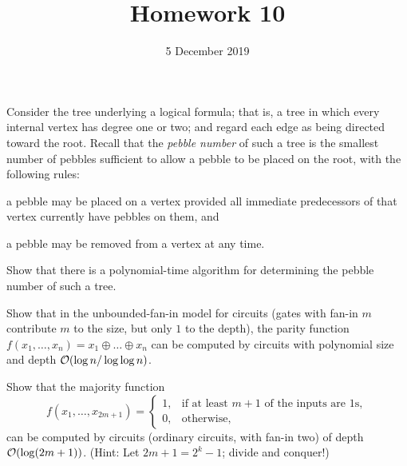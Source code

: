 \documentclass{../math167}
\title{Homework 10}
\author{}
\date{5 December 2019}
\begin{document}
\begin{problems}
\item Consider the tree underlying a logical formula; that is, a tree
  in which every internal vertex has degree one or two; and regard
  each edge as being directed toward the root.  Recall that the
  \emph{pebble number} of such a tree is the smallest number of
  pebbles sufficient to allow a pebble to be placed on the root, with
  the following rules:
  \begin{enumerate*}
  \item a pebble may be placed on a vertex provided all immediate
    predecessors of that vertex currently have pebbles on them, and
  \item a pebble may be removed from a vertex at any time.
  \end{enumerate*}
  Show that there is a polynomial-time algorithm for determining the
  pebble number of such a tree.

  \begin{solution}
  \end{solution}

\item Show that in the unbounded-fan-in model for circuits (gates with
  fan-in \(m\) contribute \(m\) to the size, but only \(1\) to the
  depth), the parity function
  \(f(x_1, \dots, x_n) = x_1 \oplus \dots \oplus x_n\) can be computed
  by circuits with polynomial size and depth
  \(\mathcal O(\log n / \log \log n)\).

  \begin{solution}
  \end{solution}

\item Show that the majority function
  \[
    f(x_1, \dots, x_{2m+1}) =
    \begin{cases}
      1, & \text{if at least \(m+1\) of the inputs are \(1\)s}, \\
      0, & \text{otherwise},
    \end{cases}
  \]
  can be computed by circuits (ordinary circuits, with fan-in two) of
  depth \(\O\prn*{\log(2m+1)}\).  (Hint: Let \(2m+1 = 2^k-1\); divide
  and conquer!)

  \begin{solution}
  \end{solution}

\end{problems}
\end{document}
